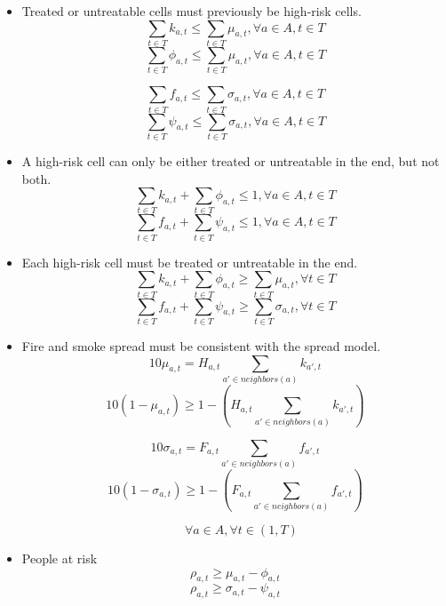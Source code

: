 \begin{itemize}
    $$\sum_{t \in T} f_{a,t} \leq 1, \quad \forall a \in A, \forall t \in T$$ 
    $$\sum_{t \in T} \phi_{a,t} \leq 1, \quad \forall a \in A, \forall t \in T$$ 
    $$\sum_{t \in T} \psi_{a,t} \leq 1, \quad \forall a \in A, \forall t \in T$$ 

    \item Treated or untreatable cells must previously be high-risk cells.
    $$\sum_{t \in T} k_{a,t} \leq \sum_{t \in T} \mu_{a,t}, \forall a \in A, t \in T$$
    $$\sum_{t \in T} \phi_{a,t} \leq \sum_{t \in T} \mu_{a,t}, \forall a \in A, t \in T$$

    $$\sum_{t \in T} f_{a,t} \leq \sum_{t \in T} \sigma_{a,t}, \forall a \in A, t \in T$$
    $$\sum_{t \in T} \psi_{a,t} \leq \sum_{t \in T} \sigma_{a,t}, \forall a \in A, t \in T$$

    \item A high-risk cell can only be either treated or untreatable in the end, but not both.
    $$\sum_{t \in T} k_{a,t} + \sum_{t \in T} \phi_{a,t} \leq 1, \forall a \in A, t \in T$$
    $$\sum_{t \in T} f_{a,t} + \sum_{t \in T} \psi_{a,t} \leq 1, \forall a \in A, t \in T$$   
    
    \item Each high-risk cell must be treated or untreatable in the end. 
    $$\sum_{t \in T} k_{a,t} + \sum_{t \in T} \phi_{a,t} \geq \sum_{t \in T} \mu_{a,t}, \forall t \in T$$
    $$\sum_{t \in T} f_{a,t} + \sum_{t \in T} \psi_{a,t} \geq \sum_{t \in T} \sigma_{a,t}, \forall t \in T$$

    \item Fire and smoke spread must be consistent with the spread model.  
    $$10 \mu_{a,t} = H_{a,t} \sum_{a' \in neighbors(a)} k_{a',t}$$
    $$10 (1-\mu_{a,t}) \geq 1 - (H_{a,t} \sum_{a' \in neighbors(a)} k_{a',t})$$

    $$10 \sigma_{a,t} = F_{a,t} \sum_{a' \in neighbors(a)} f_{a',t}$$
    $$10 (1-\sigma_{a,t}) \geq 1 - (F_{a,t} \sum_{a' \in neighbors(a)} f_{a',t})$$

    $$\quad \forall a \in A, \forall t \in (1, T)$$

    \item People at risk
    $$\rho_{a,t} \geq \mu_{a,t} - \phi_{a,t}$$
    $$\rho_{a,t} \geq \sigma_{a,t} - \psi_{a,t}$$

\end{itemize}